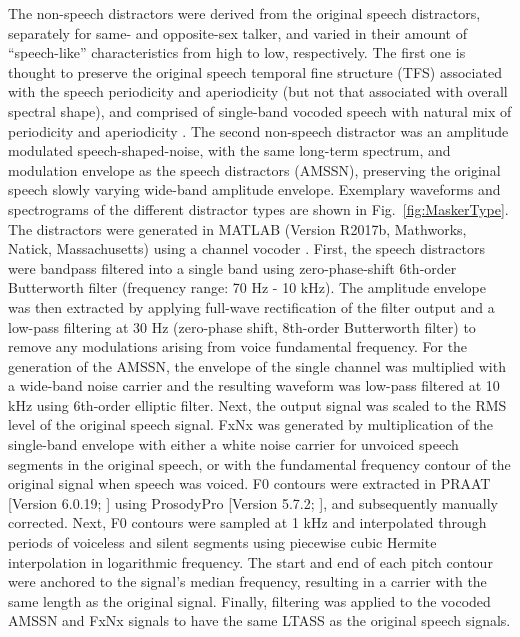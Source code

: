 \documentclass[a4paper, twoside]{templates/ociamthesis}
\begin{document}
The non-speech distractors were derived from the original speech distractors, separately for same- and opposite-sex talker, and varied in their amount of ``speech-like'' characteristics from high to low, respectively. The first one is thought to preserve the original speech temporal fine structure (TFS) associated with the speech periodicity and aperiodicity (but not that associated with overall spectral shape), and comprised of single-band vocoded speech with natural mix of periodicity and aperiodicity \autocite[FxNx; also described in][]{Steinmetzger2015}. The second non-speech distractor was an amplitude modulated speech-shaped-noise, with the same long-term spectrum, and modulation envelope as the speech distractors (AMSSN), preserving the original speech slowly varying wide-band amplitude envelope. Exemplary waveforms and spectrograms of the different distractor types are shown in Fig.~\ref{fig:MaskerType}. The distractors were generated in MATLAB (Version R2017b, Mathworks, Natick, Massachusetts) using a channel vocoder \autocites[described in][]{Green2013,Steinmetzger2015}. First, the speech distractors were bandpass filtered into a single band using zero-phase-shift 6th-order Butterworth filter (frequency range: 70 Hz - 10 kHz). The amplitude envelope was then extracted by applying full-wave rectification of the filter output and a low-pass filtering at 30 Hz (zero-phase shift, 8th-order Butterworth filter) to remove any modulations arising from voice fundamental frequency. For the generation of the AMSSN, the envelope of the single channel was multiplied with a wide-band noise carrier and the resulting waveform was low-pass filtered at 10 kHz using 6th-order elliptic filter. Next, the output signal was scaled to the RMS level of the original speech signal. FxNx was generated by multiplication of the single-band envelope with either a white noise carrier for unvoiced speech segments in the original speech, or with the fundamental frequency contour of the original signal when speech was voiced. F0 contours were extracted in PRAAT {[}Version 6.0.19; \textcite{Boersma2001}{]} using ProsodyPro {[}Version 5.7.2; \textcite{Xu2013}{]}, and subsequently manually corrected. Next, F0 contours were sampled at 1 kHz and interpolated through periods of voiceless and silent segments using piecewise cubic Hermite interpolation in logarithmic frequency. The start and end of each pitch contour were anchored to the signal's median frequency, resulting in a carrier with the same length as the original signal. Finally, filtering was applied to the vocoded AMSSN and FxNx signals to have the same LTASS as the original speech signals.\\
\end{document}
